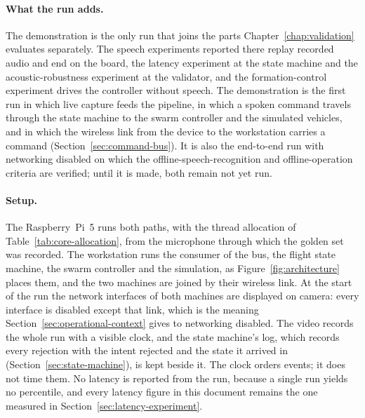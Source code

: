 \paragraph{What the run adds.} The demonstration is the only run that joins the parts
Chapter~\ref{chap:validation} evaluates separately. The speech experiments reported there replay
recorded audio and end on the board, the latency experiment at the state machine and the
acoustic-robustness experiment at the validator, and the formation-control experiment drives the
controller without speech. The demonstration is the first run in which live capture feeds the
pipeline, in which a spoken command travels through the state machine to the swarm controller and
the simulated vehicles, and in which the wireless link from the device to the workstation carries a
command (Section~\ref{sec:command-bus}). It is also the end-to-end run with networking disabled on
which the offline-speech-recognition and offline-operation criteria are verified; until it is made,
both remain not yet run.

\paragraph{Setup.} The Raspberry~Pi~5 runs both paths, with the thread allocation of
Table~\ref{tab:core-allocation}, from the microphone through which the golden set was recorded. The
workstation runs the consumer of the bus, the flight state machine, the swarm controller and the
simulation, as Figure~\ref{fig:architecture} places them, and the two machines are joined by their
wireless link. At the start of the run the network interfaces of both machines are displayed on
camera: every interface is disabled except that link, which is the meaning
Section~\ref{sec:operational-context} gives to networking disabled. The video records the whole run
with a visible clock, and the state machine's log, which records every rejection with the intent
rejected and the state it arrived in (Section~\ref{sec:state-machine}), is kept beside it. The clock
orders events; it does not time them. No latency is reported from the run, because a single run
yields no percentile, and every latency figure in this document remains the one measured in
Section~\ref{sec:latency-experiment}.

